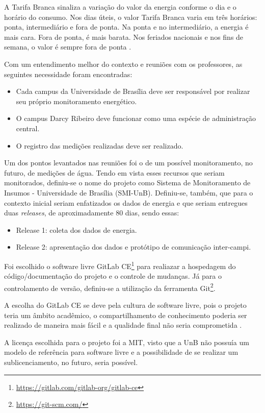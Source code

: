 A Tarifa Branca sinaliza a variação do valor da energia conforme o dia e o horário do consumo. Nos dias úteis, o valor Tarifa Branca varia em três horários: ponta, intermediário e fora de ponta. Na ponta e no intermediário, a energia é mais cara. Fora de ponta, é mais barata. Nos feriados nacionais e nos fins de semana, o valor é sempre fora de ponta \cite{aneel}.

Com um entendimento melhor do contexto e reuniões com os professores, as seguintes necessidade foram encontradas:

\begin{itemize}
    \item Cada campus da Universidade de Brasília deve ser responsável por realizar seu próprio monitoramento energético.
    \item O campus Darcy Ribeiro deve funcionar como uma espécie de administração central.
    \item O registro das medições realizadas deve ser realizado.
\end{itemize}

Um dos pontos levantados nas reuniões foi o de um possível monitoramento, no futuro, de medições de água. Tendo em vista esses recursos que seriam monitorados, definiu-se o nome do projeto como Sistema de Monitoramento de Insumos - Universidade de Brasília (SMI-UnB). Definiu-se, também, que para o contexto inicial seriam enfatizados os dados de energia e que seriam entregues duas \textit{releases}, de aproximadamente 80 dias, sendo essas:

\begin{itemize}
    \item Release 1: coleta dos dados de energia.
    \item Release 2: apresentação dos dados e protótipo de comunicação inter-campi.
\end{itemize}

Foi escolhido o software livre GitLab CE\footnote{\url{https://gitlab.com/gitlab-org/gitlab-ce}} para realiazar a hospedagem do código/documentação do projeto e o controle de mudanças. Já para o controlamento de versão, definiu-se a utilização da ferramenta Git\footnote{\url{https://git-scm.com/}}.

A escolha do GitLab CE se deve pela cultura de software livre, pois o projeto teria um âmbito acadêmico, o compartilhamento de conhecimento poderia ser realizado de maneira mais fácil e a qualidade final não seria comprometida \cite{raymond1999}.

A licença escolhida para o projeto foi a MIT, visto que a UnB não possuía um modelo de referência para software livre e a possibilidade de se realizar um sublicenciamento, no futuro, seria possível.

